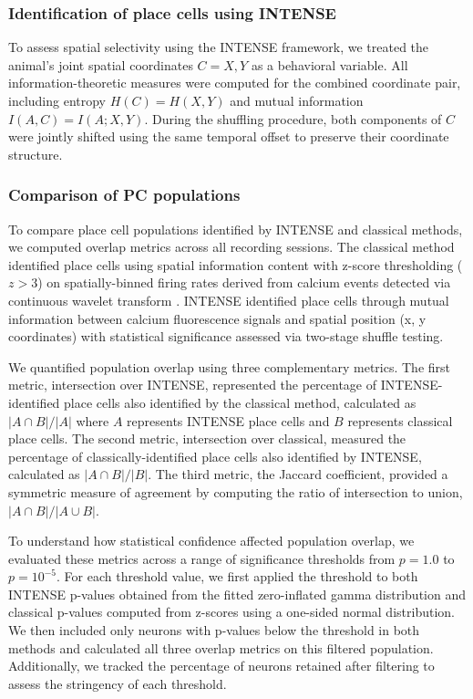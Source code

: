 \subsubsection{Identification of place cells using INTENSE}
\label{sec:intense_pc_identification}
To assess spatial selectivity using the INTENSE framework, we treated the animal's
joint spatial coordinates $C={X,Y}$ as a behavioral variable. All
information-theoretic measures were computed for the combined coordinate pair,
including entropy $H(C) = H(X,Y)$ and mutual information $I(A,C) = I(A; X,Y)$.
During the shuffling procedure, both components of $C$ were jointly shifted using
the same temporal offset to preserve their coordinate structure.


\subsubsection{Comparison of PC populations}
\label{sec:comparison_pc_populations}
To compare place cell populations identified by INTENSE and classical methods, we
computed overlap metrics across all recording sessions. The classical method
identified place cells using spatial information content with z-score thresholding
($z>3$) on spatially-binned firing rates derived from calcium events detected via
continuous wavelet transform \cite{Neugornet2021}. INTENSE identified
place cells through mutual information between calcium fluorescence signals and
spatial position (x, y coordinates) with statistical significance assessed via
two-stage shuffle testing.

We quantified population overlap using three complementary metrics. The first
metric, intersection over INTENSE, represented the percentage of INTENSE-identified
place cells also identified by the classical method, calculated as $|A \cap B| /
|A|$ where $A$ represents INTENSE place cells and $B$ represents classical place
cells. The second metric, intersection over classical, measured the percentage of
classically-identified place cells also identified by INTENSE, calculated as $|A
\cap B| / |B|$. The third metric, the Jaccard coefficient, provided a symmetric
measure of agreement by computing the ratio of intersection to union, $|A \cap B| /
|A \cup B|$.

To understand how statistical confidence affected population overlap, we evaluated
these metrics across a range of significance thresholds from $p = 1.0$ to $p =
10^{-5}$. For each threshold value, we first applied the threshold to both INTENSE
p-values obtained from the fitted zero-inflated gamma distribution and classical p-values computed
from z-scores using a one-sided normal distribution. We then included only neurons
with p-values below the threshold in both methods and calculated all three overlap
metrics on this filtered population. Additionally, we tracked the percentage of
neurons retained after filtering to assess the stringency of each threshold.

